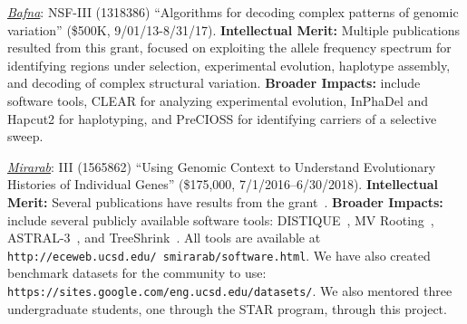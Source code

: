 \noindent
\emph{\underline{Bafna}}: NSF-III (1318386) ``Algorithms for decoding complex patterns of genomic variation'' (\$500K, 9/01/13-8/31/17).  
{\bf Intellectual Merit:} Multiple publications resulted from this grant\cite{Lo2013,Ronen2013,Zhou2013,Lo2013b,Patel2014,Udpa2014,Kramer2014,Kinsella2014,Ronen2014,
Chen2015,
Zakov2015,Ronen2015,Flannery2015,Beyter2016,Patel2016,Stobdan2015,
Azad2016, Ronen2016, Edge2017, Iranmehr2017, Azad2017, Stobdan2017}, focused on exploiting the allele frequency spectrum for identifying regions under selection, experimental evolution, haplotype assembly, and decoding of complex structural variation. {\bf Broader Impacts:} include software tools, CLEAR for analyzing experimental evolution\cite{Iranmehr2017}, InPhaDel\cite{Patel2016} and Hapcut2\cite{Edge2017} for haplotyping, and PreCIOSS for identifying carriers of a selective sweep\cite{Ronen2015}.

\noindent
\emph{\underline{Mirarab}}: III (1565862) ``Using Genomic Context to Understand Evolutionary Histories of Individual Genes'' (\$175,000, 7/1/2016--6/30/2018). {\bf Intellectual Merit:} 
Several publications have results from the grant~\cite{distique,MVroot,Shekhar2017,insects,astral3,Mai2017,dual-birth}.
{\bf Broader Impacts:} 
include several publicly available software
tools: DISTIQUE~\cite{distique},
MV Rooting~\cite{MVroot}, ASTRAL-3~\cite{astral3}, and TreeShrink~\cite{Mai2017}.
All tools are available at
{\tt http://eceweb.ucsd.edu/~smirarab/software.html}.
We have also created benchmark datasets
for the community to use:
 {\tt https://sites.google.com/eng.ucsd.edu/datasets/}.
 We also mentored three undergraduate students, one through the STAR program, through this project.
